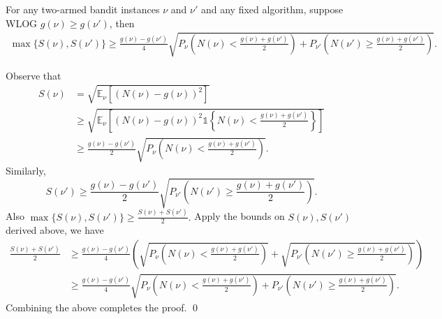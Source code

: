 \documentclass[nonblindrev]{informs3_noinforms}
\begin{document}
{
\begin{lemma}\label{lem:S_lower_bound}
For any two-armed bandit instances $\nu$ and $\nu'$ and any fixed algorithm, suppose WLOG $g(\nu) \ge g(\nu')$, then 
    \begin{align*}        
    \max\{S(\nu),S(\nu')\}\geq\frac{g(\nu)-g(\nu')}{4}\sqrt{P_{\nu}\left(N(\nu)<\frac{g(\nu)+g(\nu')}{2}\right)+P_{\nu'}\left(N(\nu')\geq \frac{g(\nu)+g(\nu')}{2}\right)}.
    \end{align*}
\end{lemma}
Observe that
 \begin{align*}
    S(\nu)&=\sqrt{\mathbb E_{\nu}[(N(\nu)-g(\nu))^2]}\\
    &\geq\sqrt{\mathbb E_{\nu}\left[(N(\nu)-g(\nu))^2\mathds 1\left\{N(\nu)<\frac{g(\nu)+g(\nu')}{2}\right\}\right]}\\
    &\geq \frac{g(\nu)-g(\nu')}{2}\sqrt{P_{\nu}\left(N(\nu)<\frac{g(\nu)+g(\nu')}{2}\right)}.
\end{align*}
Similarly, 
\[
S(\nu')\geq \frac{g(\nu)-g(\nu')}{2}\sqrt{P_{\nu'}\left(N(\nu')\geq \frac{g(\nu)+g(\nu')}{2}\right)}.
\]
Also $\max\{S(\nu),S(\nu')\}\ge\frac{S(\nu)+S(\nu')}{2}.$ Apply the bounds on $S(\nu), S(\nu')$ derived above, we have
\begin{align*}
\frac{S(\nu)+S(\nu')}{2}
    &\geq\frac{g(\nu)-g(\nu')}{4}\left(\sqrt{P_{\nu}\left(N(\nu)<\frac{g(\nu)+g(\nu')}{2}\right)}+\sqrt{P_{\nu'}\left(N(\nu')\geq \frac{g(\nu)+g(\nu')}{2}\right)}\right)\\
    &\geq\frac{g(\nu)-g(\nu')}{4}\sqrt{P_{\nu}\left(N(\nu)<\frac{g(\nu)+g(\nu')}{2}\right)+P_{\nu'}\left(N(\nu')\geq \frac{g(\nu)+g(\nu')}{2}\right)}.
\end{align*}
Combining the above completes the proof. \qed
\endproof
}
\end{document}
